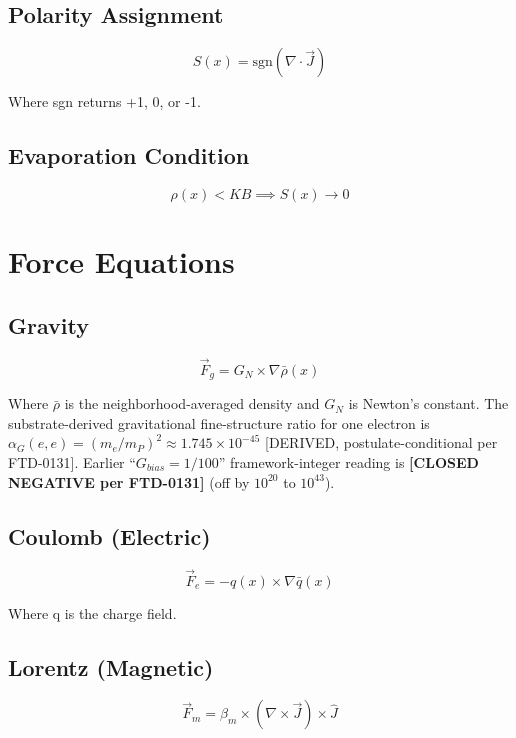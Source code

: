 \documentclass[
  11pt,
  letterpaper,
  twoside,
  openright]{book}
\begin{document}
\subsection{Polarity Assignment}\label{polarity-assignment}

\[
S(x) = \text{sgn}(\nabla \cdot \vec{J})
\]

Where sgn returns +1, 0, or -1.

\subsection{Evaporation Condition}\label{evaporation-condition}

\[
\rho(x) < KB \implies S(x) \rightarrow 0
\]

\section{Force Equations}\label{force-equations}

\subsection{Gravity}\label{gravity}

\[
\vec{F}_g = G_N \times \nabla\bar{\rho}(x)
\]

Where \(\bar{\rho}\) is the neighborhood-averaged density and \(G_N\) is
Newton's constant. The substrate-derived gravitational fine-structure
ratio for one electron is
\(\alpha_G(e,e) = (m_e/m_P)^2 \approx 1.745 \times 10^{-45}\)
{[}DERIVED, postulate-conditional per FTD-0131{]}. Earlier
``\(G_{bias} = 1/100\)'' framework-integer reading is \textbf{{[}CLOSED
NEGATIVE per FTD-0131{]}} (off by \(10^{20}\) to \(10^{43}\)).

\subsection{Coulomb (Electric)}\label{coulomb-electric}

\[
\vec{F}_e = -q(x) \times \nabla\bar{q}(x)
\]

Where q is the charge field.

\subsection{Lorentz (Magnetic)}\label{lorentz-magnetic}

\[
\vec{F}_m = \beta_m \times (\nabla \times \vec{J}) \times \hat{J}
\]
\end{document}
